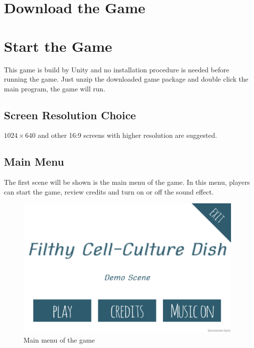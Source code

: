 \documentclass[12pt,a4paper]{scrartcl}
\begin{document}
\section{Download the Game}

\section{Start the Game}
This game is build by Unity and no installation procedure is needed before running the game. Just unzip the downloaded game package and double click the main program, the game will run.

\subsection{Screen Resolution Choice}

$1024\times640$ and other 16:9 screens with higher resolution are suggested.

\subsection{Main Menu}
The first scene will be shown is the main menu of the game. In this menu, players can start the game, review credits and turn on or off the sound effect.
\begin{figure}[h] 
	\centering
	\includegraphics[scale=0.2]{start1}
	\caption{Main menu of the game}
\end{figure}
\end{document}
